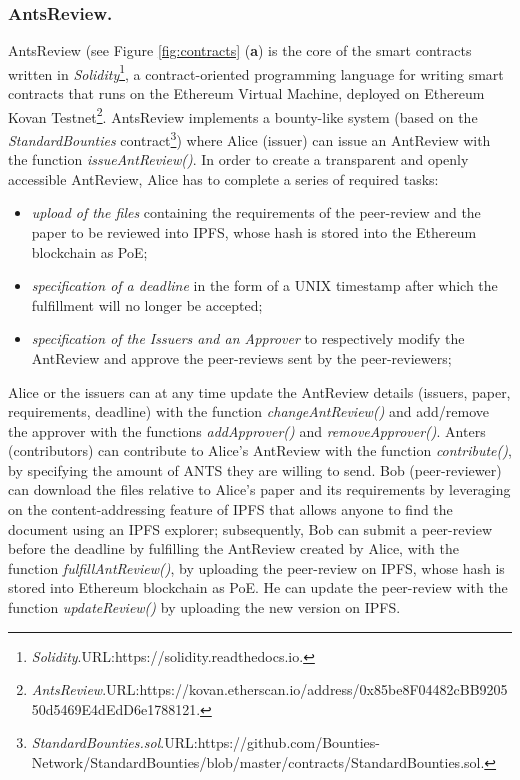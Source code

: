 \documentclass[runningheads]{llncs}
\begin{document}
\subsubsection{AntsReview.}
AntsReview (see Figure \ref{fig:contracts} (\textbf{a}) is the core of the smart contracts written in \emph{Solidity}\footnote[7]{\emph{Solidity}.\textsc{URL:}https://solidity.readthedocs.io.}, a contract-oriented programming language for writing smart contracts that runs on the Ethereum Virtual Machine, deployed on Ethereum Kovan Testnet\footnote[8]{\emph{AntsReview}.\textsc{URL:}\newline https://kovan.etherscan.io/address/0x85be8F04482cBB920550d5469E4dEdD6e1788121.}. AntsReview implements a bounty-like system (based on the \emph{StandardBounties} contract\footnote[9]{\emph{StandardBounties.sol}.\textsc{URL:}https://github.com/Bounties-Network/StandardBounties/blob/master/contracts/StandardBounties.sol.}) where Alice (issuer) can issue an AntReview with the function \emph{issueAntReview()}.
\newline In order to create a transparent and openly accessible AntReview, Alice has to complete a series of required tasks:
 \begin{itemize}
     \item \emph{upload of the files} containing the requirements of the peer-review and the paper to be reviewed into IPFS, whose hash is stored into the Ethereum blockchain as PoE;
     \item \emph{specification of a deadline} in the form of a UNIX timestamp after which the fulfillment will no longer be accepted;
     \item \emph{specification of the Issuers and an Approver} to respectively modify the AntReview and approve the peer-reviews sent by the peer-reviewers;
\end{itemize}
 Alice or the issuers can at any time update the AntReview details (issuers, paper, requirements, deadline) with the function \emph{changeAntReview()} and add/remove the approver with the functions \emph{addApprover()} and \emph{removeApprover()}.
 Anters (contributors) can contribute to Alice's AntReview with the function \emph{contribute()}, by specifying the amount of ANTS they are willing to send. 
 \newline Bob (peer-reviewer) can download the files relative to Alice's paper and its requirements by leveraging on the content-addressing feature of IPFS that allows anyone to find the document using an IPFS explorer; subsequently, Bob can submit a peer-review before the deadline by fulfilling the AntReview created by Alice, with the function \emph{fulfillAntReview()}, by uploading the peer-review on IPFS, whose hash is stored into Ethereum blockchain as PoE. He can update the peer-review with the function \emph{updateReview()} by uploading the new version on IPFS. 
\end{document}
